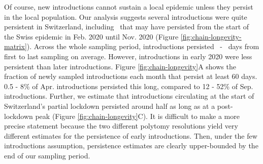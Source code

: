 \documentclass[11pt,twoside,lineno]{pnas-new} %
\begin{document}
Of course, new introductions cannot sustain a local epidemic unless they persist in the local population. Our analysis suggests several introductions were quite persistent in Switzerland, including \nspanningchainsfebnovmin\ that may have persisted from the start of the Swiss epidemic in Feb. 2020 until Nov. 2020 (Figure \ref{fig:chain-longevity-matrix}). Across the whole sampling period, introductions persisted \meantimetolastsamplemax\ - \meantimetolastsamplemin\ days from first to last sampling on average. However, introductions in early 2020 were less persistent than later introductions. Figure \ref{fig:chain-longevity}A shows the fraction of newly sampled introductions each month that persist at least 60 days. 0.5 - 8\% of Apr. introductions persisted this long, compared to 12 - 52\% of Sep. introductions. Further,  we estimate that introductions circulating at the start of Switzerland’s partial lockdown persisted around half as long as at a post-lockdown peak (Figure \ref{fig:chain-longevity}C). It is difficult to make a more precise statement because the two different polytomy resolutions yield very different estimates for the persistence of early introductions. Then, under the few introductions assumption, persistence estimates are clearly upper-bounded by the end of our sampling period.
\end{document}
